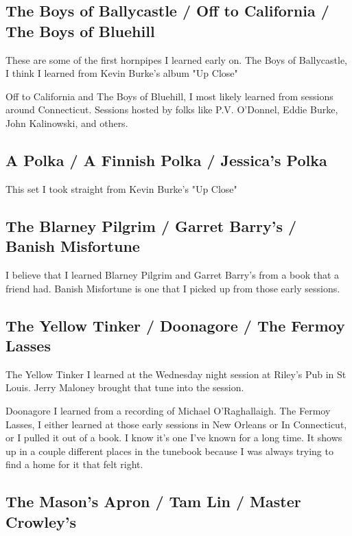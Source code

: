 \documentclass[11pt,letterpaper]{article}
\begin{document}
\subsection*{The Boys of Ballycastle / Off to California / The Boys of Bluehill}

These are some of the first hornpipes I learned early on. The Boys of Ballycastle, I think I learned from Kevin Burke's album "Up Close"

Off to California and The Boys of Bluehill, I most likely learned from sessions around Connecticut. Sessions hosted by folks like P.V. O'Donnel, Eddie Burke, John Kalinowski, and others.

\subsection*{A Polka / A Finnish Polka / Jessica's Polka}

This set I took straight from Kevin Burke's "Up Close"

\subsection*{The Blarney Pilgrim / Garret Barry's / Banish Misfortune}

I believe that I learned Blarney Pilgrim and Garret Barry's from a book that a friend had. Banish Misfortune is one that I picked up from those early sessions.

\subsection*{The Yellow Tinker / Doonagore / The Fermoy Lasses}

The Yellow Tinker I learned at the Wednesday night session at Riley's Pub in St Louis. Jerry Maloney brought that tune into the session.

Doonagore I learned from a recording of Michael O'Raghallaigh. The Fermoy Lasses, I either learned at those early sessions in New Orleans or In Connecticut, or I pulled it out of a book. I know it's one I've known for a long time. It shows up in a couple different places in the tunebook because I was always trying to find a home for it that felt right. 

\subsection*{The Mason's Apron / Tam Lin / Master Crowley's}
\end{document}
